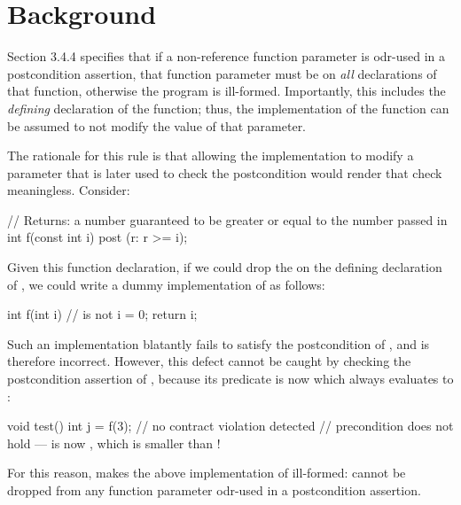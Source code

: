 





\section{Background}
\label{bg}

\cite{P2900R10} Section 3.4.4 specifies that if a non-reference function parameter is odr-used in a postcondition assertion, that function parameter must be  on \emph{all} declarations of that function, otherwise the program is ill-formed.  Importantly, this includes the \emph{defining} declaration of the function; thus, the implementation of the function can be assumed to not modify the value of that parameter.

The rationale for this rule is that allowing the implementation to modify a parameter that is later used to check the postcondition would render that check meaningless. Consider:
\begin{codeblock}
// Returns: a number guaranteed to be greater or equal to the number passed in
int f(const int i) post (r: r >= i);
\end{codeblock}
Given this function declaration, if we could drop the  on the defining declaration of , we could write a dummy implementation of  as follows:
\begin{codeblock}
int f(int i) {  //  is not 
  i = 0;
  return i;
}
\end{codeblock}
Such an implementation blatantly fails to satisfy the postcondition of , and is therefore incorrect. However, this defect cannot be caught by checking the postcondition assertion of , because its predicate is now  which always evaluates to :
\begin{codeblock}
void test() {
  int j = f(3); // no contract violation detected
  // precondition does not hold ---  is now , which is smaller than !
}
\end{codeblock}
For this reason, \cite{P2900R10} makes the above implementation of  ill-formed:  cannot be dropped from any function parameter odr-used in a postcondition assertion.


